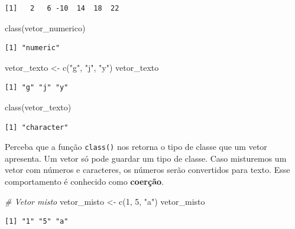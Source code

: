 \documentclass[
  brazilian,
]{book}
\newenvironment{Shaded}{\begin{snugshade}}{\end{snugshade}}
\newcommand{\CommentTok}[1]{\textcolor[rgb]{0.56,0.35,0.01}{\textit{#1}}}
\newcommand{\DecValTok}[1]{\textcolor[rgb]{0.00,0.00,0.81}{#1}}
\newcommand{\FunctionTok}[1]{\textcolor[rgb]{0.00,0.00,0.00}{#1}}
\newcommand{\NormalTok}[1]{#1}
\newcommand{\OtherTok}[1]{\textcolor[rgb]{0.56,0.35,0.01}{#1}}
\newcommand{\StringTok}[1]{\textcolor[rgb]{0.31,0.60,0.02}{#1}}
\begin{document}
\begin{verbatim}
[1]   2   6 -10  14  18  22
\end{verbatim}

\begin{Shaded}
\begin{Highlighting}[]
\FunctionTok{class}\NormalTok{(vetor\_numerico)}
\end{Highlighting}
\end{Shaded}

\begin{verbatim}
[1] "numeric"
\end{verbatim}

\begin{Shaded}
\begin{Highlighting}[]
\NormalTok{vetor\_texto }\OtherTok{\textless{}{-}} \FunctionTok{c}\NormalTok{(}\StringTok{"g"}\NormalTok{, }\StringTok{"j"}\NormalTok{, }\StringTok{"y"}\NormalTok{)}
\NormalTok{vetor\_texto}
\end{Highlighting}
\end{Shaded}

\begin{verbatim}
[1] "g" "j" "y"
\end{verbatim}

\begin{Shaded}
\begin{Highlighting}[]
\FunctionTok{class}\NormalTok{(vetor\_texto)}
\end{Highlighting}
\end{Shaded}

\begin{verbatim}
[1] "character"
\end{verbatim}

Perceba que a função \texttt{class()} nos retorna o tipo de classe que um vetor apresenta. Um vetor só pode guardar um tipo de classe. Caso misturemos um vetor com números e caracteres, os números serão convertidos para texto. Esse comportamento é conhecido como \textbf{coerção}.

\begin{Shaded}
\begin{Highlighting}[]
\CommentTok{\# Vetor misto}
\NormalTok{vetor\_misto }\OtherTok{\textless{}{-}} \FunctionTok{c}\NormalTok{(}\DecValTok{1}\NormalTok{, }\DecValTok{5}\NormalTok{, }\StringTok{"a"}\NormalTok{)}
\NormalTok{vetor\_misto}
\end{Highlighting}
\end{Shaded}

\begin{verbatim}
[1] "1" "5" "a"
\end{verbatim}
\end{document}
